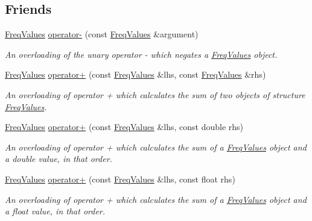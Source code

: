 \subsection*{Friends}
\begin{DoxyCompactItemize}
\item 
\hyperlink{structFreqValues}{Freq\+Values} \hyperlink{structFreqValues_af2d38eb1ad1d3c6dfab8b4ea399c867d}{operator-\/} (const \hyperlink{structFreqValues}{Freq\+Values} \&argument)
\begin{DoxyCompactList}\small\item\em An overloading of the unary operator -\/ which negates a {\itshape \hyperlink{structFreqValues}{Freq\+Values}} object. \end{DoxyCompactList}\item 
\hyperlink{structFreqValues}{Freq\+Values} \hyperlink{structFreqValues_aa27b2370e9b314e6e0f308f4efb39a2f}{operator+} (const \hyperlink{structFreqValues}{Freq\+Values} \&lhs, const \hyperlink{structFreqValues}{Freq\+Values} \&rhs)
\begin{DoxyCompactList}\small\item\em An overloading of operator + which calculates the sum of two objects of structure {\itshape \hyperlink{structFreqValues}{Freq\+Values}}. \end{DoxyCompactList}\item 
\hyperlink{structFreqValues}{Freq\+Values} \hyperlink{structFreqValues_aea7bf21485b730f47cb3823920a10b57}{operator+} (const \hyperlink{structFreqValues}{Freq\+Values} \&lhs, const double rhs)
\begin{DoxyCompactList}\small\item\em An overloading of operator + which calculates the sum of a {\itshape \hyperlink{structFreqValues}{Freq\+Values}} object and a {\itshape double} value, in that order. \end{DoxyCompactList}\item 
\mbox{\label{structFreqValues_afa29d8e6cf56d1c724c712bcc95c0e4b}} 
\hyperlink{structFreqValues}{Freq\+Values} \hyperlink{structFreqValues_afa29d8e6cf56d1c724c712bcc95c0e4b}{operator+} (const \hyperlink{structFreqValues}{Freq\+Values} \&lhs, const float rhs)
\begin{DoxyCompactList}\small\item\em An overloading of operator + which calculates the sum of a {\itshape \hyperlink{structFreqValues}{Freq\+Values}} object and a {\itshape float} value, in that order. \end{DoxyCompactList}\item 

\end{DoxyCompactItemize}
